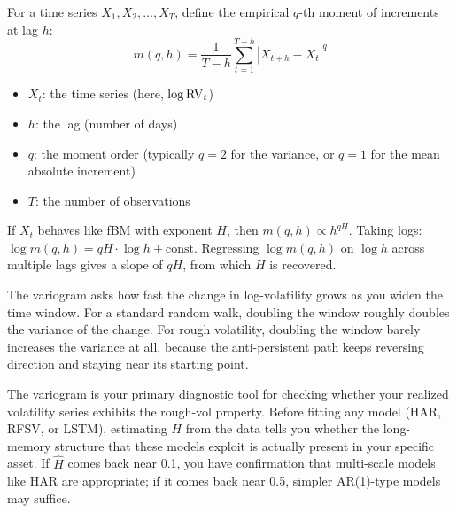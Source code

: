\begin{definition}
\label{def:variogram}
For a time series $X_1, X_2, \ldots, X_T$, define the empirical $q$-th moment of increments at lag $h$:
\begin{equation}
  m(q, h) = \frac{1}{T - h} \sum_{t=1}^{T-h} |X_{t+h} - X_t|^q
  \label{eq:variogram}
\end{equation}
\begin{itemize}[nosep]
  \item $X_t$: the time series (here, $\log \operatorname{RV}_t$)
  \item $h$: the lag (number of days)
  \item $q$: the moment order (typically $q = 2$ for the variance, or $q = 1$ for the mean absolute increment)
  \item $T$: the number of observations
\end{itemize}
If $X_t$ behaves like fBM with exponent $H$, then $m(q, h) \propto h^{qH}$.
Taking logs: $\log m(q, h) = qH \cdot \log h + \text{const}$.
Regressing $\log m(q, h)$ on $\log h$ across multiple lags gives a slope of $qH$, from which $H$ is recovered.
\end{definition}

\begin{intuition}
The variogram asks how fast the change in log-volatility grows as you widen the time window.
For a standard random walk, doubling the window roughly doubles the variance of the change.
For rough volatility, doubling the window barely increases the variance at all, because the anti-persistent path keeps reversing direction and staying near its starting point.
\end{intuition}

\begin{projectconnection}
The variogram is your primary diagnostic tool for checking whether your realized volatility series exhibits the rough-vol property.
Before fitting any model (HAR, RFSV, or LSTM), estimating $H$ from the data tells you whether the long-memory structure that these models exploit is actually present in your specific asset.
If $\hat{H}$ comes back near 0.1, you have confirmation that multi-scale models like HAR are appropriate; if it comes back near 0.5, simpler AR(1)-type models may suffice.
\end{projectconnection}

